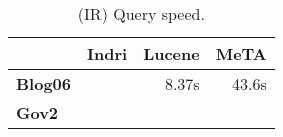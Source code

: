 \begin{table}[t]
\centering
{\small
\begin{tabular}{|l|r|r|r|}
    \hline & \textbf{Indri} & \textbf{Lucene} & \textbf{MeTA} \\
    \hline
    \textbf{Blog06} & & 8.37s & 43.6s \\
    \textbf{Gov2} & & & \\
    \hline
\end{tabular}
\caption{(IR) Query speed.}
\label{table:ir-query-speed}
}
\end{table}
